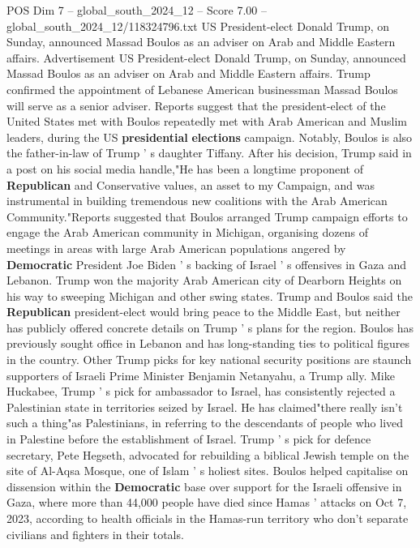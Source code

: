 \begin{textsample}{POS Dim 7 – global\_south\_2024\_12 – Score 7.00 – global\_south\_2024\_12/118324796.txt}  \label{ex:f7_pos_350}
US President-elect Donald Trump, on Sunday, announced Massad Boulos as an adviser on Arab and Middle Eastern affairs.
Advertisement US President-elect Donald Trump, on Sunday, announced Massad Boulos as an adviser on Arab and Middle Eastern affairs.
Trump confirmed the appointment of Lebanese American businessman Massad Boulos will serve as a senior adviser.
Reports suggest that the president-elect of the United States met with Boulos repeatedly met with Arab American and Muslim leaders, during the US \textbf{presidential} \textbf{elections} campaign.
Notably, Boulos is also the father-in-law of Trump ' s daughter Tiffany.
After his decision, Trump said in a post on his social media handle,"He has been a longtime proponent of \textbf{Republican} and Conservative values, an asset to my Campaign, and was instrumental in building tremendous new coalitions with the Arab American Community."Reports suggested that Boulos arranged Trump campaign efforts to engage the Arab American community in Michigan, organising dozens of meetings in areas with large Arab American populations angered by \textbf{Democratic} President Joe Biden ' s backing of Israel ' s offensives in Gaza and Lebanon.
Trump won the majority Arab American city of Dearborn Heights on his way to sweeping Michigan and other swing states.
Trump and Boulos said the \textbf{Republican} president-elect would bring peace to the Middle East, but neither has publicly offered concrete details on Trump ' s plans for the region.
Boulos has previously sought office in Lebanon and has long-standing ties to political figures in the country.
Other Trump picks for key national security positions are staunch supporters of Israeli Prime Minister Benjamin Netanyahu, a Trump ally.
Mike Huckabee, Trump ' s pick for ambassador to Israel, has consistently rejected a Palestinian state in territories seized by Israel.
He has claimed"there really isn't such a thing"as Palestinians, in referring to the descendants of people who lived in Palestine before the establishment of Israel.
Trump ' s pick for defence secretary, Pete Hegseth, advocated for rebuilding a biblical Jewish temple on the site of Al-Aqsa Mosque, one of Islam ' s holiest sites.
Boulos helped capitalise on dissension within the \textbf{Democratic} base over support for the Israeli offensive in Gaza, where more than 44,000 people have died since Hamas ' attacks on Oct 7, 2023, according to health officials in the Hamas-run territory who don't separate civilians and fighters in their totals.

\end{textsample}
